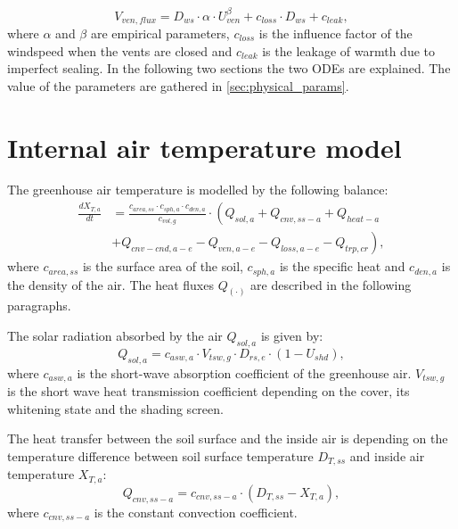 \begin{equation}\label{eq:venflux}
V_{ven,flux} = D_{ws} \cdot \alpha \cdot U_{ven}^\beta + c_{loss} \cdot D_{ws} + c_{leak},
\end{equation} 
where $\alpha$ and $\beta$ are empirical parameters, $c_{loss}$ is the influence factor of the windspeed when the vents are closed and $c_{leak}$ is the leakage of warmth due to imperfect sealing.
In the following two sections the two ODEs are explained.
The value of the parameters are gathered in \cref{sec:physical_params}.
\section{Internal air temperature model}
\label{sec:temp}
The greenhouse air temperature is modelled by the following balance:
\begin{equation}\label{eq:temp}
\begin{split}
\frac{dX_{T,a}}{dt} &= \frac{c_{area,ss} \cdot c_{sph,a} \cdot c_{den,a}}{c_{vol,g}} \cdot \left(Q_{sol,a} + Q_{cnv,ss-a} + Q_{heat-a} \right.\\
		& \left. + Q_{cnv-cnd,a-e} - Q_{ven,a-e} - Q_{loss,a-e} - Q_{trp,cr}\right),
\end{split}
\end{equation}
where $c_{area,ss}$ is the surface area of the soil, $c_{sph,a}$ is the specific heat and $c_{den,a}$ is the density of the air.
The heat fluxes $Q_{(\cdot)}$ are described in the following paragraphs.

The solar radiation absorbed by the air $Q_{sol,a}$ is given by:
\begin{equation}\label{eq:rs}
Q_{sol,a} = c_{asw,a} \cdot V_{tsw,g} \cdot D_{rs,e} \cdot \left( 1 - U_{shd} \right),
\end{equation}
where $c_{asw,a}$ is the short-wave absorption coefficient of the greenhouse air. $V_{tsw,g}$ is the short wave heat transmission coefficient depending on the cover, its whitening state and the shading screen.

The heat transfer between the soil surface and the inside air is depending on the temperature difference between soil surface temperature $D_{T,ss}$ and inside air temperature $X_{T,a}$:
\begin{equation}\label{eq:ss}
Q_{cnv,ss-a} = c_{cnv,ss-a} \cdot (D_{T,ss}-X_{T,a}),
\end{equation}
where $c_{cnv,ss-a}$ is the constant convection coefficient.

